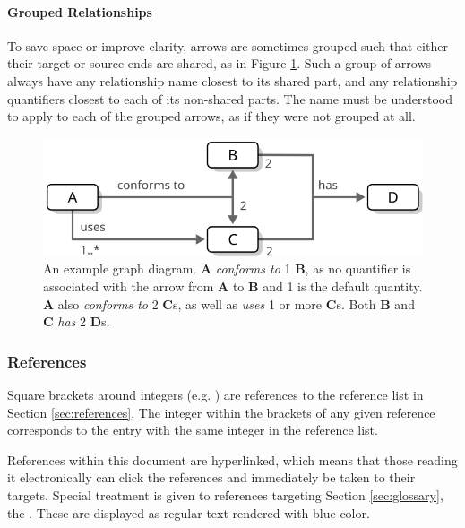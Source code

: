 \paragraph{Grouped Relationships}
To save space or improve clarity, arrows are sometimes grouped such that either their target or source ends are shared, as in Figure \ref{fig:graph-diagram}.
Such a group of arrows always have any relationship name closest to its shared part, and any relationship quantifiers closest to each of its non-shared parts.
The name must be understood to apply to each of the grouped arrows, as if they were not grouped at all.

\begin{figure}[ht!]
  \centering
  \includegraphics[scale=0.9]{figures/graph-diagram}
  \caption{
    An example graph diagram.
    \textbf{A} \textit{conforms to} 1 \textbf{B}, as no quantifier is associated with the arrow from \textbf{A} to \textbf{B} and 1 is the default quantity.
    \textbf{A} also \textit{conforms to} 2 \textbf{C}s, as well as \textit{uses} 1 or more \textbf{C}s.
    Both \textbf{B} and \textbf{C} \textit{has} 2 \textbf{D}s.
  }
  \label{fig:graph-diagram}
\end{figure}

\subsubsection{References}

Square brackets around integers (e.g. \cite{delsing2017iot}) are references to the reference list in Section \ref{sec:references}.
The integer within the brackets of any given reference corresponds to the entry with the same integer in the reference list.

References within this document are hyperlinked, which means that those reading it electronically can click the references and immediately be taken to their targets.
Special treatment is given to references targeting Section \ref{sec:glossary}, the .
These are displayed as regular text rendered with blue color.

